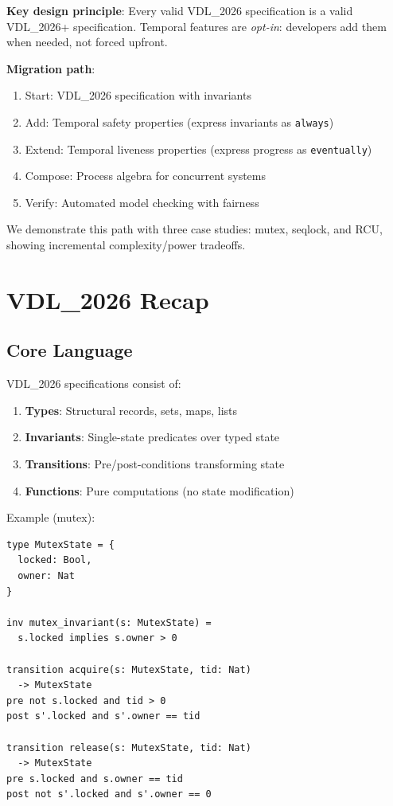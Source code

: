 \documentclass[conference]{IEEEtran}
\begin{document}
\textbf{Key design principle}: Every valid VDL\_2026 specification is a valid VDL\_2026+ specification. Temporal features are \textit{opt-in}: developers add them when needed, not forced upfront.

\textbf{Migration path}:
\begin{enumerate}
\item Start: VDL\_2026 specification with invariants
\item Add: Temporal safety properties (express invariants as \texttt{always})
\item Extend: Temporal liveness properties (express progress as \texttt{eventually})
\item Compose: Process algebra for concurrent systems
\item Verify: Automated model checking with fairness
\end{enumerate}

We demonstrate this path with three case studies: mutex, seqlock, and RCU, showing incremental complexity/power tradeoffs.

\section{VDL\_2026 Recap}
\label{sec:vdl2026}

\subsection{Core Language}

VDL\_2026 specifications consist of:

\begin{enumerate}
\item \textbf{Types}: Structural records, sets, maps, lists
\item \textbf{Invariants}: Single-state predicates over typed state
\item \textbf{Transitions}: Pre/post-conditions transforming state
\item \textbf{Functions}: Pure computations (no state modification)
\end{enumerate}

Example (mutex):

\begin{lstlisting}[caption={VDL\_2026 mutex specification}]
type MutexState = {
  locked: Bool,
  owner: Nat
}

inv mutex_invariant(s: MutexState) =
  s.locked implies s.owner > 0

transition acquire(s: MutexState, tid: Nat)
  -> MutexState
pre not s.locked and tid > 0
post s'.locked and s'.owner == tid

transition release(s: MutexState, tid: Nat)
  -> MutexState
pre s.locked and s.owner == tid
post not s'.locked and s'.owner == 0
\end{lstlisting}
\end{document}
